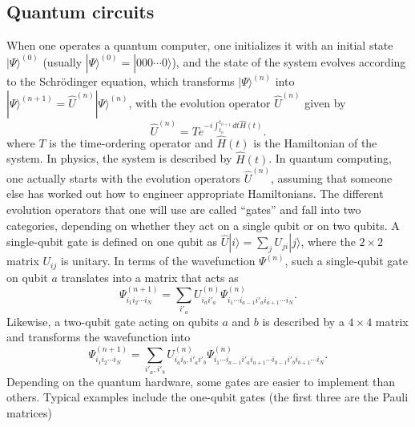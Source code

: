 \documentclass{SciPost}
\newcommand{\ket}[1]{|#1\rangle}
\begin{document}
\subsection{Quantum circuits}
When one operates a quantum computer, one initializes it with an initial
state $\ket{\Psi}^{(0)}$ (usually $\ket{\Psi}^{(0)} = \ket{000\cdots{}0}$),
and the state of the system evolves according
to the Schrödinger equation, which transforms $\ket{\Psi}^{(n)}$ into
$\ket{\Psi}^{(n+1)} = \hat U^{(n)} \ket{\Psi}^{(n)}$,
with the evolution operator $\hat U^{(n)}$ given by
\begin{equation}
\hat U^{(n)} = T e^{-i\int_{t_n}^{t_{n+1}} dt \hat H(t)}.
\end{equation}
where $T$ is the time-ordering operator and $\hat H(t)$ is the Hamiltonian of the system.
In physics, the system is described by $\hat H(t)$. In quantum computing, one actually starts with the evolution operators $\hat U^{(n)}$, assuming that someone else has worked out
how to engineer appropriate Hamiltonians. The different evolution operators that one will use are called ``gates'' and fall into two categories, depending on whether they act on a single qubit or on two qubits. A single-qubit gate is defined on one qubit as $\hat U\ket{i} =
\sum_j U_{ji}\ket{j}$, where the $2\times 2$ matrix $U_{ij}$ is unitary. In terms of the wavefunction $\Psi^{(n)}$, such a single-qubit gate on qubit $a$ translates into a matrix that acts as
\begin{equation}
\label{eq:1qubit_gate}
\Psi_{i_1i_2\cdots{}i_N}^{(n+1)} = \sum_{i'_a} U^{(n)}_{i_ai'_a}
\Psi_{i_1\cdots{}i_{a-1}i'_a i_{a+1}\cdots{}i_N}^{(n)}.
\end{equation}
Likewise, a two-qubit gate acting on qubits $a$ and $b$ is described by a $4\times 4$ matrix
and transforms the wavefunction into
\begin{equation}
\label{eq:2qubit_gate}
\Psi_{i_1i_2\cdots{}i_N}^{(n+1)} = \sum_{i'_a,i'_b} U^{(n)}_{i_ai_b,i'_ai'_b}
\Psi_{i_1\cdots{}i_{a-1}i'_a i_{a+1}\cdots{}i_{b-1}i'_b i_{b+1}\cdots{}i_N}^{(n)}.
\end{equation}
Depending on the quantum hardware, some gates are easier to implement than others. Typical examples include the one-qubit gates (the first three are the Pauli matrices)
\end{document}
